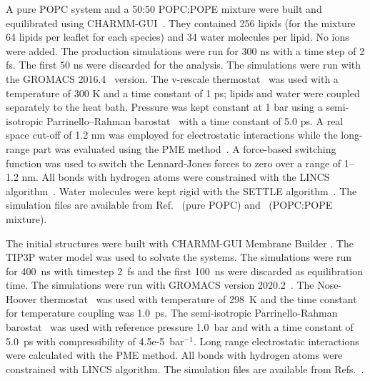\documentclass[journal=jpcbfk]{achemso}
\begin{document}


A pure POPC system and a 50:50 POPC:POPE mixture were built and equilibrated using CHARMM-GUI~\cite{lee16}.
They contained 256 lipids (for the mixture 64 lipids per leaflet for each species) and 34 water molecules per lipid.
No ions were added.
The production simulations were run for 300 ns with a time step of 2 fs.
The first 50 ns were discarded for the analysis.
The simulations were run with the GROMACS 2016.4~\cite{abraham2015gromacs} version.
The v-rescale thermostat~\cite{bussi07} was used with a temperature of 300 K and a time constant of 1 ps; lipids and water were coupled separately to the heat bath.
Pressure was kept constant at 1 bar using a semi-isotropic Parrinello--Rahman barostat~\cite{parrinello81} with a time constant of 5.0 ps.
A real space cut-off of 1.2 nm was employed for electrostatic interactions while the long-range part was evaluated using the PME method~\cite{darden93,essman95}.
A force-based switching function was used to switch the Lennard-Jones forces to zero over a range of 1--1.2 nm.
All bonds with hydrogen atoms were constrained with the LINCS algorithm~\cite{hess07,hess97}.
Water molecules were kept rigid with the SETTLE algorithm~\cite{miyamoto92}.
The simulation files are available from Ref.~ (pure POPC) and~ (POPC:POPE mixture).

The initial structures were built with CHARMM-GUI Membrane Builder \cite{lee16}. The TIP3P water model was used to solvate the systems. The simulations were run for 400~ns with timestep 2~fs and the first 100~ns were discarded as equilibration time. The simulations were run with GROMACS version 2020.2~\cite{pall20}. The Nose-Hoover thermostat~\cite{nose84,hoover85} was used with temperature of 298~K and the time constant for temperature coupling was 1.0~ps. The semi-isotropic Parrinello-Rahman barostat~\cite{parrinello81} was used with reference pressure 1.0~bar and with a time constant of 5.0~ps with compressibility of 4.5e-5~bar$^{-1}$. Long range electrostatic interactions were calculated with the PME method. All bonds with hydrogen atoms were constrained with LINCS algorithm.
The simulation files are available from Refs.~.
\end{document}

